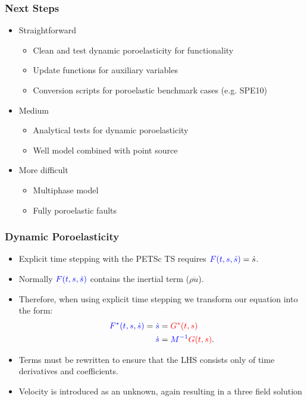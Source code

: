 \documentclass[aspectratio=169,hyperref=colorlinks]{beamer}
\begin{document}
\begin{frame}
  \frametitle{Next Steps}
  
  \begin{itemize}
  \item Straightforward
    \begin{itemize}
        \item Clean and test dynamic poroelasticity for functionality
        \item Update functions for auxiliary variables
        \item Conversion scripts for poroelastic benchmark cases (e.g. SPE10)
    \end{itemize}
  \item Medium
    \begin{itemize}
      \item Analytical tests for dynamic poroelasticity
      \item Well model combined with point source
    \end{itemize}
  \item More difficult  
    \begin{itemize}
    \item Multiphase model
    \item Fully poroelastic faults
    \end{itemize}
  \end{itemize}


\end{frame}



\begin{frame}
  \frametitle{Dynamic Poroelasticity}
  
  \begin{itemize}
    \item Explicit time stepping with the PETSc TS requires ${\color{blue}F(t,s,\dot{s})} = \dot{s}$.
    \item Normally ${\color{blue}F(t,s,\dot{s})}$ contains the inertial term ($\rho \ddot{u}$).
    \item  Therefore, when using explicit time stepping we transform our equation into the form:
      \begin{align*}
        {\color{blue}F^*(t,s,\dot{s})} = {\color{blue}\dot{s}} &= {\color{red}G^*(t,s)} \\
        {\color{blue}\dot{s}} &= {\color{blue}M^{-1}}{\color{red}G(t,s)}.
      \end{align*} 
    \item Terms must be rewritten to ensure that the LHS consists only of time derivatives and coefficients.
    \item Velocity is introduced as an unknown, again resulting in a three field solution
  \end{itemize}
\end{frame}
\end{document}
